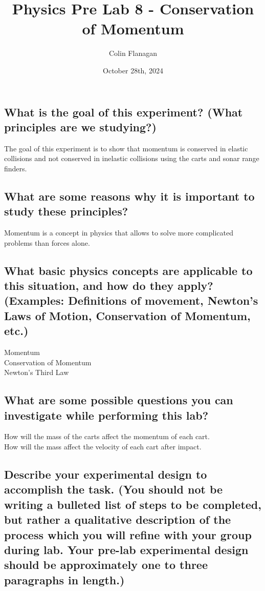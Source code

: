 \documentclass{article}
\title{Physics Pre Lab 8 - Conservation of Momentum}
\author{Colin Flanagan}
\date{October 28th, 2024}
\begin{document}
\maketitle

\subsection*{What is the goal of this experiment? (What principles are we studying?)}

    The goal of this experiment is to show that momentum is conserved in elastic collisions and not conserved in inelastic collisions using the carts and sonar range finders.
    

\subsection*{What are some reasons why it is important to study these principles?
}

    Momentum is a concept in physics that allows to solve more complicated problems than forces alone.
    
\subsection*{What basic physics concepts are applicable to this situation, and how do they apply? (Examples: Definitions of movement, Newton’s Laws of Motion, Conservation of Momentum, etc.)}

    Momentum\\

    Conservation of Momentum\\

    Newton's Third Law\\

\subsection*{What are some possible questions you can investigate while performing this lab?
}

   How will the mass of the carts affect the momentum of each cart.\\

   How will the mass affect the velocity of each cart after impact.\\

\subsection*{Describe your experimental design to accomplish the task. (You should not be writing a bulleted list of steps to be completed, but rather a qualitative description of the process which you will refine with your group during lab. Your pre-lab experimental design should be approximately one to three paragraphs in length.)}
\end{document}
